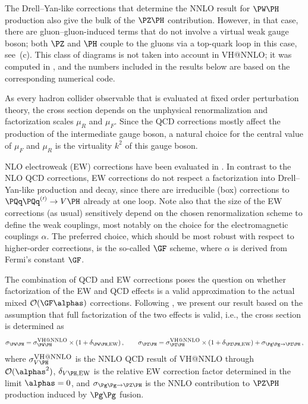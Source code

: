 The Drell--Yan-like corrections that determine the NNLO result for
$\PW\PH$ production also give the bulk of the $\PZ\PH$
contribution. However, in that case, there are gluon--gluon-induced
terms that do not involve a virtual weak gauge boson; both $\PZ$ and
$\PH$ couple to the gluons via a top-quark loop in this case, see
\,(c). This class of diagrams is not taken
into account in {\sc VH@NNLO}; it was computed in
, and the numbers included in the results below are based on
the corresponding numerical code.

As every hadron collider observable that is evaluated at fixed order
perturbation theory, the cross section depends on the unphysical
renormalization and factorization scales $\mu_R$ and $\mu_F$.  Since the
QCD corrections mostly affect the production of the intermediate gauge
boson, a natural choice for the central value of $\mu_F$ and $\mu_R$ is
the virtuality $k^2$ of this gauge boson.

NLO electroweak (EW) corrections have been evaluated in
.  In contrast to the NLO QCD corrections,
EW corrections do not respect a factorization into
Drell--Yan-like production and decay, since there are irreducible (box)
corrections to $\PQq\PQq^{(\prime)}\to V\PH$ already at one loop.  Note also
that the size of the EW corrections (as usual) sensitively
depend on the chosen renormalization scheme to define the weak
couplings, most notably on the choice for the electromagnetic couplings
$\alpha$. The preferred choice, which should be most robust with
respect to higher-order corrections, is the so-called $\GF$ scheme,
where $\alpha$ is derived from Fermi's constant $\GF$.

The combination of QCD and EW corrections poses
the question on whether factorization of the
EW and QCD effects is a valid approximation to the actual
mixed ${\cal O}(\GF\alphas)$ corrections. Following ,
we present our result based
on the assumption that full factorization of the two effects is valid,
i.e., the cross section is determined as
\begin{equation}
\begin{split}
\sigma_{\PW\PH} = \sigma_{\PW\PH}^{\mbox{\footnotesize\sc VH@NNLO}} 
\times (1 + \delta_{\PW\PH,\rm EW})\,, \qquad
\sigma_{\PZ\PH} = \sigma_{\PZ\PH}^{\mbox{\footnotesize\sc VH@NNLO}} 
\times (1 + \delta_{\PZ\PH,\rm EW})
+\sigma_{\Pg\Pg\to\PZ\PH} \,,
\end{split}
\end{equation}
where $\sigma_{V\PH}^{\mbox{\footnotesize\sc VH@NNLO}}$ 
is the NNLO QCD result of {\sc VH@NNLO} 
through ${\cal O}(\alphas^2)$, $\delta_{V\PH,\rm EW}$ is the relative 
EW correction factor determined in the limit $\alphas=0$, and
$\sigma_{\Pg\Pg\to\PZ\PH}$ is the NNLO contribution 
to $\PZ\PH$ production induced by $\Pg\Pg$ fusion.


